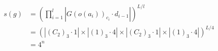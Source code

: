 \documentclass[preview]{standalone}
\begin{document}
\begin{align*}
s(g) &= \left(\prod_{i=1}^{l}\left|G(o(a_i))_{c_i}\cdot d_{i-1}\right|\right)^{L/l} \\   &= \left(\left|(C_2)_3\cdot 1\right| \times \left|(1)_3\cdot 4\right|\times \left|(C_2)_3\cdot 1\right| \times \left|(1)_3\cdot 4\right|\right)^{L/4} \\   &= 4^{n}
\end{align*}
\end{document}
